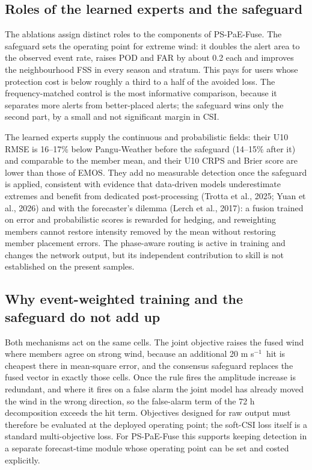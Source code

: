 \documentclass[12pt]{article}
\newcommand{\mps}{m s$^{-1}$}
\begin{document}
\subsection{Roles of the learned experts and the safeguard}
\label{sec:roles}

The ablations assign distinct roles to the components of PS-PaE-Fuse. The safeguard sets the operating point for extreme wind: it doubles the alert area to the observed event rate, raises POD and FAR by about 0.2 each and improves the neighbourhood FSS in every season and stratum. This pays for users whose protection cost is below roughly a third to a half of the avoided loss. The frequency-matched control is the most informative comparison, because it separates more alerts from better-placed alerts; the safeguard wins only the second part, by a small and not significant margin in CSI.

The learned experts supply the continuous and probabilistic fields: their U10 RMSE is 16--17\% below Pangu-Weather before the safeguard (14--15\% after it) and comparable to the member mean, and their U10 CRPS and Brier score are lower than those of EMOS. They add no measurable detection once the safeguard is applied, consistent with evidence that data-driven models underestimate extremes and benefit from dedicated post-processing (Trotta et al., 2025; Yuan et al., 2026) and with the forecaster's dilemma (Lerch et al., 2017): a fusion trained on error and probabilistic scores is rewarded for hedging, and reweighting members cannot restore intensity removed by the mean without restoring member placement errors. The phase-aware routing is active in training and changes the network output, but its independent contribution to skill is not established on the present samples.

\subsection{Why event-weighted training and the safeguard do not add up}
\label{sec:interaction}

Both mechanisms act on the same cells. The joint objective raises the fused wind where members agree on strong wind, because an additional 20 \mps\ hit is cheapest there in mean-square error, and the consensus safeguard replaces the fused vector in exactly those cells. Once the rule fires the amplitude increase is redundant, and where it fires on a false alarm the joint model has already moved the wind in the wrong direction, so the false-alarm term of the 72 h decomposition exceeds the hit term. Objectives designed for raw output must therefore be evaluated at the deployed operating point; the soft-CSI loss itself is a standard multi-objective loss. For PS-PaE-Fuse this supports keeping detection in a separate forecast-time module whose operating point can be set and costed explicitly.
\end{document}
